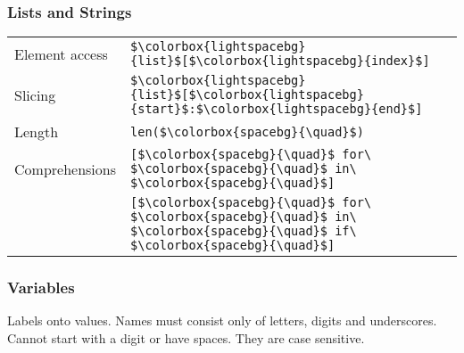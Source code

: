 \documentclass[12pt,twocolumn]{article}
\begin{document}
	\subsubsection*{Lists and Strings}
	
	\begin{tabular}{l l}
		Element access &
		\colorbox{codebg}{\lstinline|$\colorbox{lightspacebg}{list}$[$\colorbox{lightspacebg}{index}$]|} \vspace{1mm} \\
		
		Slicing &
		\colorbox{codebg}{\lstinline|$\colorbox{lightspacebg}{list}$[$\colorbox{lightspacebg}{start}$:$\colorbox{lightspacebg}{end}$]|} \vspace{1mm} \\
		
		Length &
		\colorbox{codebg}{\lstinline|len($\colorbox{spacebg}{\quad}$)|} \vspace{1mm} \\
		
		Comprehensions &
		\colorbox{codebg}{\lstinline|[$\colorbox{spacebg}{\quad}$ for\ $\colorbox{spacebg}{\quad}$ in\ $\colorbox{spacebg}{\quad}$]|} \\
		
		~ &
		\colorbox{codebg}{\lstinline|[$\colorbox{spacebg}{\quad}$ for\ $\colorbox{spacebg}{\quad}$ in\ $\colorbox{spacebg}{\quad}$ if\ $\colorbox{spacebg}{\quad}$]|} \vspace{1mm} \\
	\end{tabular}
	
	\subsubsection*{Variables}
	
	Labels onto values. Names must consist only of letters, digits and underscores. Cannot start with a digit or have spaces. They are case sensitive.
	
	\vspace{\baselineskip}
	
\end{document}
